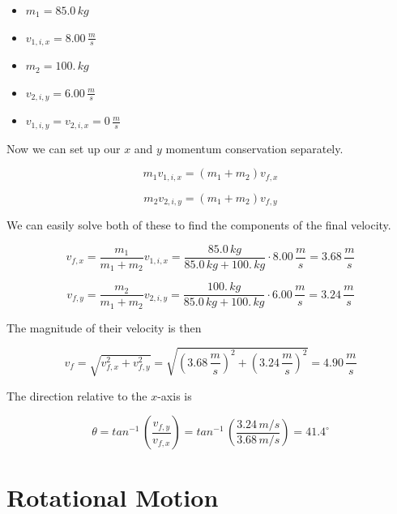 \documentclass[12pt]{book}
\begin{document}
\begin{exampleblock}
\begin{itemize}
\item $m_1 = 85.0 \, kg$
\item $v_{1,i,x} = 8.00 \, \frac{m}{s}$
\item $m_2 = 100. \, kg$
\item $v_{2,i,y} = 6.00 \, \frac{m}{s}$
\item $v_{1,i,y} = v_{2,i,x} = 0 \, \frac{m}{s}$
\end{itemize}

Now we can set up our $x$ and $y$ momentum conservation separately.

\begin{equation}
m_1 v_{1,i,x} = (m_1 + m_2) v_{f,x}
\end{equation}

\begin{equation}
m_2 v_{2,i,y} = (m_1 + m_2) v_{f,y}
\end{equation}

We can easily solve both of these to find the components of the final velocity.

\begin{equation}
v_{f,x} = \frac{m_1}{m_1 + m_2} v_{1,i,x} = \frac{85.0 \, kg}{85.0 \, kg + 100. \, kg} \cdot 8.00 \, \frac{m}{s} = 3.68 \, \frac{m}{s}
\end{equation}

\begin{equation}
v_{f,y} = \frac{m_2}{m_1 + m_2} v_{2,i,y} = \frac{100. \, kg}{85.0 \, kg + 100. \, kg} \cdot 6.00 \, \frac{m}{s} = 3.24 \, \frac{m}{s}
\end{equation}

The magnitude of their velocity is then

\begin{equation}
v_f = \sqrt{v_{f,x}^2 + v_{f,y}^2} = \sqrt{(3.68 \, \frac{m}{s})^2 + (3.24 \, \frac{m}{s})^2} = 4.90 \, \frac{m}{s}
\end{equation}

The direction relative to the $x$-axis is

\begin{equation}
\theta = tan^{-1} \, \left( \frac{v_{f,y}}{v_{f,x}} \right) = tan^{-1} \, \left( \frac{3.24 \, m/s}{3.68 \, m/s} \right) = 41.4^{\circ}
\end{equation}

\end{exampleblock}

\chapter{Rotational Motion}
\setcounter{example}{1}
\addtocounter{chp}{1}
\end{document}
